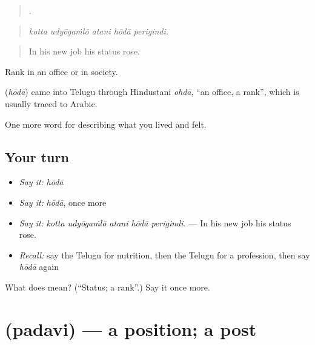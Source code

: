 \begin{quote}
    .
\end{quote}

\begin{quote}
\emph{kotta udyōgaṁlō atani hōdā perigindi.}
\end{quote}

\begin{quote}
In his new job his status rose.
\end{quote}

Rank in an office or in society.

\begin{cousinweb}
\textbf{} (\emph{hōdā}) came into Telugu through Hindustani \emph{ohdā}, \textquotedblleft{}an office, a rank\textquotedblright{}, which is usually traced to Arabic.
\end{cousinweb}

\begin{grammarlens}[title={What you've built}]
One more word for describing what you lived and felt.
\end{grammarlens}

\subsection*{Your turn}
\begin{itemize}
\raggedright
  \item \emph{Say it:} \emph{hōdā}
  \item \emph{Say it:} \emph{hōdā}, once more
  \item \emph{Say it:} \emph{kotta udyōgaṁlō atani hōdā perigindi.} — In his new job his status rose.
  \item \emph{Recall:} say the Telugu for nutrition, then the Telugu for a profession, then say \emph{hōdā} again
\end{itemize}

\begin{tcolorbox}[breakable,colback=teal!4,colframe=teal!35!black,title={Before you move on}]
What does  mean? (\textquotedblleft{}Status; a rank\textquotedblright{}.) Say it once more.
\end{tcolorbox}
\section[\texorpdfstring{\te{పదవి} (padavi)}{పదవి (padavi)}]{ (padavi) — a position; a post}

